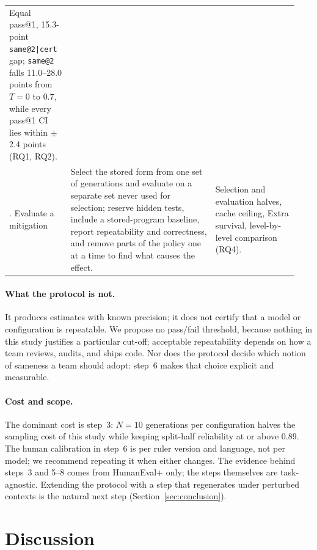 \documentclass[acmsmall,screen,review,anonymous]{acmart}
\makeatletter
\newcommand{\sameat}{\mbox{\texttt{same@2}}}
\newcommand{\sameatc}{\mbox{\texttt{same@2|cert}}}
\makeatother
\begin{document}
\begin{table}[t]
\begin{tabular}{@{}>{\raggedright\arraybackslash}p{0.20\linewidth}>{\raggedright\arraybackslash}p{0.47\linewidth}>{\raggedright\arraybackslash}p{0.27\linewidth}@{}}
      Equal pass@1, 15.3-point \sameatc{} gap; \sameat{} falls 11.0--28.0
      points from $T{=}0$ to $0.7$, while every pass@1 CI lies within $\pm$2.4 points
      (RQ1, RQ2). \\
    8. Evaluate a mitigation &
      Select the stored form from one set of generations and evaluate on a
      separate set never used for selection; reserve hidden tests, include a
      stored-program baseline, report repeatability and correctness, and
      remove parts of the policy one at a time to find what causes the
      effect. &
      Selection and evaluation halves, cache ceiling, Extra survival,
      level-by-level comparison (RQ4). \\
    \bottomrule
  \end{tabular}
\end{table}

\paragraph{What the protocol is not.}
It produces estimates with known precision; it does not certify that a model
or configuration is repeatable.
We propose no pass/fail threshold, because nothing in this study justifies a
particular cut-off; acceptable repeatability depends on how a team reviews,
audits, and ships code.
Nor does the protocol decide which notion of sameness a team should adopt:
step~6 makes that choice explicit and measurable.

\paragraph{Cost and scope.}
The dominant cost is step~3: $N{=}10$ generations per configuration halves the sampling cost of this study while keeping split-half reliability at or above 0.89.
The human calibration in step~6 is per ruler version and language, not per
model; we recommend repeating it when either changes.
The evidence behind steps~3 and 5--8 comes from HumanEval+ only; the steps
themselves are task-agnostic.
Extending the protocol with a step that regenerates under perturbed contexts
is the natural next step (Section~\ref{sec:conclusion}).

\section{Discussion}
\label{sec:discussion}
\end{document}
